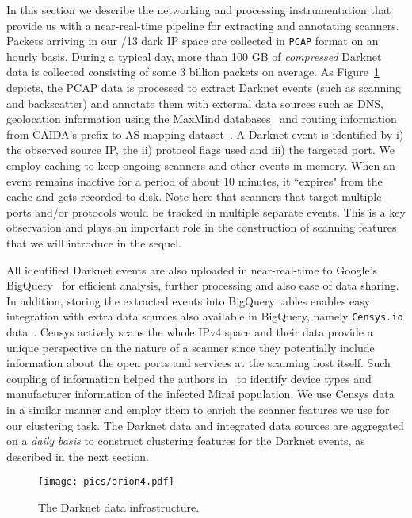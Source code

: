 \documentclass[manuscript, nonacm]{acmart}
\begin{document}
In this section we describe the networking and processing instrumentation
that provide us with a near-real-time pipeline for extracting and annotating scanners.
Packets arriving in our /13 dark IP space are collected in \texttt{PCAP} format on an hourly basis.
During a typical day, more than 100 GB of \emph{compressed} Darknet data is collected consisting of some
3 billion packets on average. As Figure~\ref{fig:orion} depicts, 
the PCAP data is processed to extract Darknet events (such
as scanning and backscatter)
and annotate them with external
data sources such as DNS, geolocation information
using the MaxMind databases~\cite{GeoIP} and routing information from CAIDA's prefix to AS mapping
dataset~\cite{pf2as}. A Darknet event is identified by 
i) the observed source IP, the ii) protocol flags used and iii) the targeted port.
We employ caching to keep ongoing scanners and other events in memory.
When an event remains 
inactive for a period of about 10 minutes, it ``expires" from the cache and gets recorded
to disk. Note here that scanners that target multiple ports and/or protocols would be
tracked in multiple separate events. This is a key observation and plays an 
important role in the construction of scanning features that we will introduce in the sequel.

All identified Darknet events are also uploaded in near-real-time to Google's BigQuery~\cite{bq}
for efficient analysis, further processing and also ease of data sharing. In addition, storing the extracted
events into BigQuery tables enables easy integration with extra data sources
also available in BigQuery, namely \texttt{Censys.io} data~\cite{censys, Durumeric:2015:SEB:2810103.2813703}.
Censys actively scans the whole IPv4 space and their 
data provide a unique perspective on the nature of a scanner since they potentially include information
about the open ports and services at the scanning host itself. Such coupling of information
helped the authors in~\cite{MiraiUSENIX2017} to identify device types and manufacturer information
of the infected Mirai population. We use Censys data in a similar manner and employ them
to enrich the scanner features we use for our clustering task.
The Darknet data and integrated data sources are aggregated on a \emph{daily basis}
to construct clustering features for the Darknet events, as described in the next section.

\begin{figure}[t]
    \centering
    \texttt{[image: pics/orion4.pdf]}
    \vspace{-40pt}
    \caption{The Darknet data infrastructure.}
    \label{fig:orion}
\end{figure}
\end{document}
